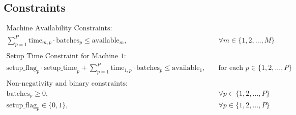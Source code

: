 \documentclass{article}
\begin{document}
\subsection*{Constraints}
\begin{align*}
\text{Machine Availability Constraints:} \\
\sum_{p=1}^{P} \text{time}_{m,p} \cdot \text{batches}_{p} \leq \text{available}_{m}, & \quad \forall m \in \{1, 2, \ldots, M\} \\
\\
\text{Setup Time Constraint for Machine 1:} \\
\text{setup\_flag}_{p} \cdot \text{setup\_time}_{p} + \sum_{p=1}^{P} \text{time}_{1,p} \cdot \text{batches}_{p} \leq \text{available}_{1}, & \quad \text{for each } p \in \{1, 2, \ldots, P\} \\
\\
\text{Non-negativity and binary constraints:} \\
\text{batches}_{p} \geq 0, & \quad \forall p \in \{1, 2, \ldots, P\} \\
\text{setup\_flag}_{p} \in \{0, 1\}, & \quad \forall p \in \{1, 2, \ldots, P\}
\end{align*}
\end{document}

